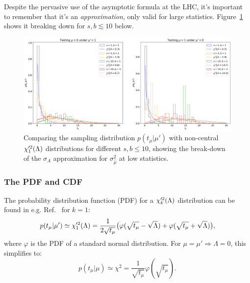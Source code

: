 Despite the pervasive use of the asymptotic formula at the LHC, it's important to remember that it's an \textit{approximation}, only valid for large statistics.
Figure~\ref{fig:03_ptmu_asym3} shows it breaking down for $s, b \lesssim 10$ below.

\begin{figure}[htb]
  \centering
  \includegraphics[width=\textwidth]{figures/03-Stats/06-asymptotic-plr/4.png}
  \caption{Comparing the sampling distribution $p(t_\mu|\mu')$ with non-central $\chi^{\prime 2}_1(\Lambda)$ distributions for different $s, b \leq 10$, showing the break-down of the $\sigma_A$ approximation for $\sigma^2_{\hat\mu}$ at low statistics.}
  \label{fig:03_ptmu_asym3}
\end{figure}

\subsubsection{The PDF and CDF}

The probability distribution function (PDF) for a $\chi^{\prime 2}_k(\Lambda)$ distribution can be found in e.g. Ref.~\cite{enwiki:1256854724} for $k=1$:
\begin{equation}
    p(t_\mu|\mu') \simeq \chi^{\prime 2}_1(\Lambda) = \frac{1}{2\sqrt{t_\mu}}\big(\varphi(\sqrt{t_\mu} - \sqrt\Lambda) + \varphi(\sqrt{t_\mu} + \sqrt\Lambda)\big),
\label{eq:03_ptmu_pdf}
\end{equation}
where $\varphi$ is the PDF of a standard normal distribution.
For $\mu = \mu' \Rightarrow \Lambda = 0$, this simplifies to:
\begin{equation}
    p(t_\mu|\mu) \simeq \chi^2 = \frac{1}{\sqrt{t_\mu}}\varphi(\sqrt{t_\mu}).
\label{eq:03_ptmu_pdf_special}
\end{equation}

